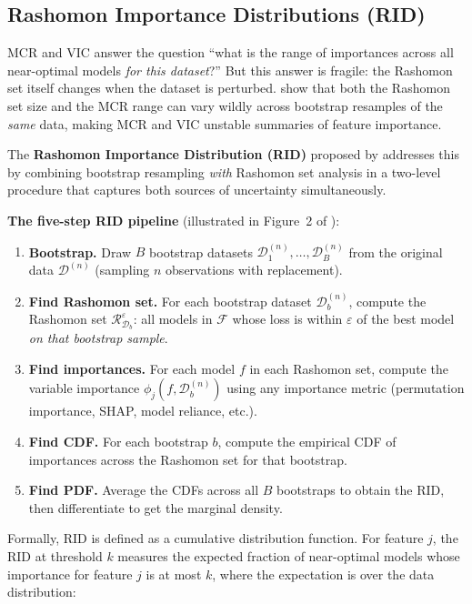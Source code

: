 \subsection{Rashomon Importance Distributions (RID)}
\label{sec:rashomon:rid}

MCR and VIC answer the question ``what is the range of importances across
all near-optimal models \emph{for this dataset}?''  But this answer is
fragile: the Rashomon set itself changes when the dataset is perturbed.
\citet{DonnellyEtAl2023} show that both the Rashomon set size and the MCR
range can vary wildly across bootstrap resamples of the \emph{same} data,
making MCR and VIC unstable summaries of feature importance.

The \textbf{Rashomon Importance Distribution (RID)} proposed by
\citet{DonnellyEtAl2023} addresses this by combining bootstrap resampling
\emph{with} Rashomon set analysis in a two-level procedure that captures
both sources of uncertainty simultaneously.

\textbf{The five-step RID pipeline} (illustrated in Figure~2 of
\citealt{DonnellyEtAl2023}):

\begin{enumerate}[leftmargin=1.8em]
  \item \textbf{Bootstrap.}  Draw $B$ bootstrap datasets
    $\mathcal{D}_1^{(n)}, \ldots, \mathcal{D}_B^{(n)}$ from the original
    data $\mathcal{D}^{(n)}$ (sampling $n$ observations with replacement).
  \item \textbf{Find Rashomon set.}  For each bootstrap dataset
    $\mathcal{D}_b^{(n)}$, compute the Rashomon set
    $\mathcal{R}_{\mathcal{D}_b}^{\varepsilon}$: all models in
    $\mathcal{F}$ whose loss is within $\varepsilon$ of the best model
    \emph{on that bootstrap sample}.
  \item \textbf{Find importances.}  For each model $f$ in each Rashomon
    set, compute the variable importance $\phi_j(f, \mathcal{D}_b^{(n)})$
    using any importance metric (permutation importance, SHAP, model
    reliance, etc.).
  \item \textbf{Find CDF.}  For each bootstrap $b$, compute the
    empirical CDF of importances across the Rashomon set for that bootstrap.
  \item \textbf{Find PDF.}  Average the CDFs across all $B$ bootstraps to
    obtain the RID, then differentiate to get the marginal density.
\end{enumerate}

Formally, RID is defined as a cumulative distribution function.  For
feature $j$, the RID at threshold $k$ measures the expected fraction of
near-optimal models whose importance for feature $j$ is at most $k$,
where the expectation is over the data distribution:

